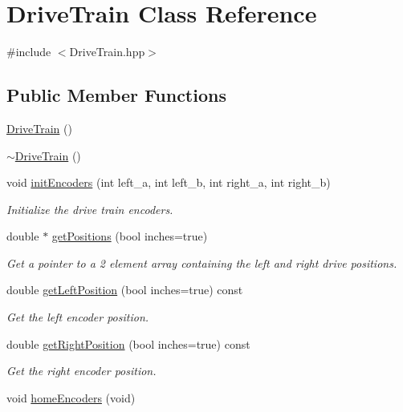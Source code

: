 \hypertarget{class_drive_train}{}\section{Drive\+Train Class Reference}
\label{class_drive_train}


{\ttfamily \#include $<$Drive\+Train.\+hpp$>$}

\subsection*{Public Member Functions}
\begin{DoxyCompactItemize}
\item 
\hyperlink{class_drive_train_a90af56eee49c93d5b7d77065b42f660b}{Drive\+Train} ()
\item 
\hyperlink{class_drive_train_a5dd1c80e30d87655b22974431b16afdf}{$\sim$\+Drive\+Train} ()
\item 
void \hyperlink{class_drive_train_aef0af224da3ee7170ac177f0fb9d54b6}{init\+Encoders} (int left\+\_\+a, int left\+\_\+b, int right\+\_\+a, int right\+\_\+b)
\begin{DoxyCompactList}\small\item\em Initialize the drive train encoders. \end{DoxyCompactList}\item 
double $\ast$ \hyperlink{class_drive_train_a1fc42308d8fe67dd412303946296e43f}{get\+Positions} (bool inches=true)
\begin{DoxyCompactList}\small\item\em Get a pointer to a 2 element array containing the left and right drive positions. \end{DoxyCompactList}\item 
double \hyperlink{class_drive_train_a9ec0f8309cf9670fec618e8b00f70390}{get\+Left\+Position} (bool inches=true) const
\begin{DoxyCompactList}\small\item\em Get the left encoder position. \end{DoxyCompactList}\item 
double \hyperlink{class_drive_train_aa52a34fcdfad88883c78b81336661137}{get\+Right\+Position} (bool inches=true) const
\begin{DoxyCompactList}\small\item\em Get the right encoder position. \end{DoxyCompactList}\item 
void \hyperlink{class_drive_train_a8cd4f236ac30b716df23971dad5d1a0a}{home\+Encoders} (void)

\end{DoxyCompactItemize}
